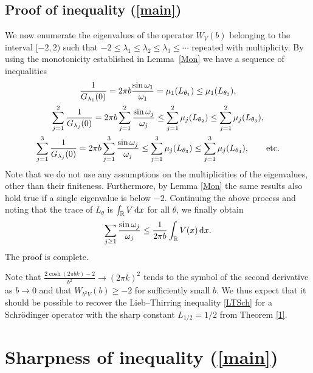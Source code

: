 \documentclass[pdftex]{sigma}%
\numberwithin{equation}{section}
\newcommand{\R}{\mathbb{R}}
\begin{document}
\subsection[Proof of inequality (1.2)]{Proof of inequality (\ref{main})}

We now enumerate the eigenvalues of the operator $W_V(b)$ belonging to the interval $[-2,2)$ such that
$-2\le \lambda_1\le\lambda_2\le\lambda_3\le \cdots$ repeated with multiplicity.
By using the monotonicity established in Lemma~\ref{Mon} we have a sequence of inequalities
\begin{gather*}
\frac{1}{G_{\lambda_1}(0)} =2\pi b \frac{\sin\omega_1}{\omega_1} = \mu_1(L_{\theta_1}) \le \mu_1(L_{\theta_2}),
\\
\sum_{j=1}^2 \frac{1}{G_{\lambda_j}(0)} = 2\pi b \sum_{j=1}^2 \frac{\sin\omega_j}{\omega_j}
\le \sum_{j=1}^2 \mu_j(L_{\theta_2})
\le \sum_{j=1}^2 \mu_j(L_{\theta_3}),
\\
\sum_{j=1}^3 \frac{1}{G_{\lambda_j}(0)} = 2\pi b \sum_{j=1}^3 \frac{\sin\omega_j}{\omega_j}
\le \sum_{j=1}^3 \mu_j(L_{\theta_3})
\le \sum_{j=1}^3 \mu_j(L_{\theta_4}), \qquad {\rm etc}.
\end{gather*}
Note that we do not use any assumptions on the multiplicities of the eigenvalues, other than their finiteness. Furthermore, by Lemma \ref{Mon} the same results also hold true if a single eigenvalue is below $-2$.
Continuing the above process and noting that the trace of $L_{\theta}$ is $\int_\R V \, {\rm d} x$ for all $\theta$, we finally obtain
\begin{gather*}
\sum_{j\ge1}\frac{\sin\omega_j}{\omega_j}\le \frac{1}{2\pi b}\int_{\R}V(x)\, {\rm d} x.
\end{gather*}
The proof is complete.

\begin{Remark}
Note that $\frac{2\cosh(2\pi bk)-2}{b^2}\to(2\pi k)^2$ tends to the symbol of the second derivative as $b\to0$ and that $W_{b^2V}(b)\ge-2$ for sufficiently small $b$. We thus expect that it should be possible to recover the Lieb--Thirring inequality \eqref{LTSch} for a Schr\"odinger operator with the sharp constant $L_{1/2}=1/2$ from Theorem \ref{1}.
\end{Remark}

\section[Sharpness of inequality (1.2)]{Sharpness of inequality (\ref{main})}\label{sec:sharp}
\end{document}
